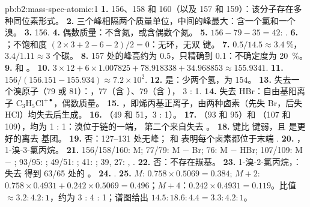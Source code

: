 \begin{solution}{pb:b2:mass-spec-atomic:1}
\textbf{1.} 156、158 和 160（以及 157 和 159）：该分子存在多种同位素形式。
\textbf{2.} 三个峰相隔两个质量单位，中间的峰最大：含一个氯和一个溴。
\textbf{3.} 156.
\textbf{4.} 偶数质量：不含氮，或含偶数个氮。
\textbf{5.} $156 - 79 - 35 = 42$: .
\textbf{6.} ；不饱和度 $(2 \times 3 + 2 - 6 - 2)/2 = 0$：无环，无双
键。
\textbf{7.} $0.5/14.5 \approx 3.4~\%$，$3.4/1.11 \approx 3$ 个碳。
\textbf{8.} 157 处的峰高约为 0.5，只精确到 0.1：不确定度为 20~\%。
\textbf{9.}  和 。
\textbf{10.} $3 \times 12 + 6 \times 1.007825 + 78.918338 + 34.968853 \approx 155.9341$.
\textbf{11.} $156/(156.151 - 155.934) \approx 7.2 \times 10^2$.
\textbf{12.} 是：少两个氢，为 154。
\textbf{13.} 失去一个溴原子（79 或 81）：，77（含 ）、79（含 ），
3 : 1.
\textbf{14.} 失去 HBr：自由基阳离子 $\mathrm{C_3H_5Cl^{+\bullet}}$，偶数质量。
\textbf{15.} ，即烯丙基正离子，由两种卤素（先失 Br，后失 HCl）均失去后生成。
\textbf{16.} （49 和 51，3 : 1）。
\textbf{17.} （93 和 95）和 （107 和 109），均为 1 : 1：溴位于链的一端，
第二个来自失去 。
\textbf{18.}  键比  键弱，且  是更好的离去
基团。
\textbf{19.} 否：127--131 处无峰； 和  表明每个卤素都位于末端
.
\textbf{20.} ，1-溴-3-氯丙烷。
\textbf{21.} 156/158/160: M; 77/79: M $-$ Br; 76: M $-$ HBr; 107/109: M $-$ ;
93/95: ; 49/51: ; 41: ; 39, 27: , .
\textbf{22.} 否：不存在羰基。
\textbf{23.} 1-溴-2-氯丙烷，：失去  得到 63/65 处的 。
\textbf{24.} .
\textbf{25.} $M$: $0.758 \times 0.5069 = 0.384$; $M+2$: $0.758 \times 0.4931 + 0.242 \times 0.5069 =
0.496$；$M+4$：$0.242 \times 0.4931 = 0.119$。比值 $\boldsymbol{\approx 3.2 : 4.2 : 1}$，约为 3 : 4 :
1；谱图给出 $14.5 : 18.6 : 4.4 = 3.3 : 4.2 : 1$。
\end{solution}
